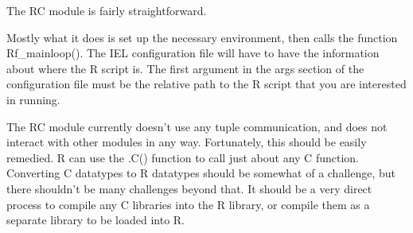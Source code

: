 The RC module is fairly straightforward.



Mostly what it does is set up the necessary environment, then calls the function Rf\_mainloop(). The IEL configuration file will have to have the information about where the R script is. The first argument in the args section of the configuration file must be the relative path to the R script that you are interested in running.

The RC module currently doesn't use any tuple communication, and does not interact with other modules in any way. Fortunately, this should be easily remedied. R can use the .C() function to call just about any C function. Converting C datatypes to R datatypes should be somewhat of a challenge, but there shouldn't be many challenges beyond that. It should be a very direct process to compile any C libraries into the R library, or compile them as a separate library to be loaded into R.
